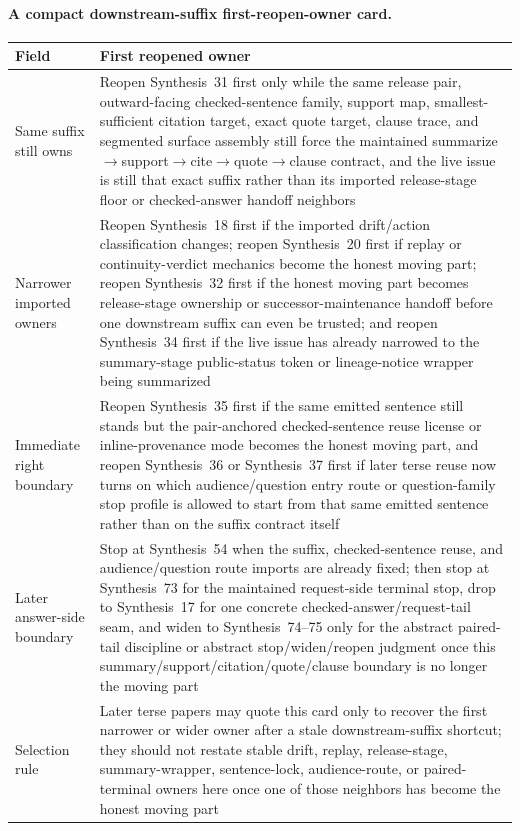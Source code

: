 \documentclass[11pt]{article}
\begin{document}
\paragraph{A compact downstream-suffix first-reopen-owner card.}
\begin{table}[t]
\centering
\small
\begin{tabularx}{\linewidth}{@{}lX@{}}
\toprule
Field & First reopened owner \\
\midrule
Same suffix still owns & Reopen Synthesis~31 first only while the same release pair, outward-facing checked-sentence family, support map, smallest-sufficient citation target, exact quote target, clause trace, and segmented surface assembly still force the maintained summarize$\to$support$\to$cite$\to$quote$\to$clause contract, and the live issue is still that exact suffix rather than its imported release-stage floor or checked-answer handoff neighbors \\
Narrower imported owners & Reopen Synthesis~18 first if the imported drift/action classification changes; reopen Synthesis~20 first if replay or continuity-verdict mechanics become the honest moving part; reopen Synthesis~32 first if the honest moving part becomes release-stage ownership or successor-maintenance handoff before one downstream suffix can even be trusted; and reopen Synthesis~34 first if the live issue has already narrowed to the summary-stage public-status token or lineage-notice wrapper being summarized \\
Immediate right boundary & Reopen Synthesis~35 first if the same emitted sentence still stands but the pair-anchored checked-sentence reuse license or inline-provenance mode becomes the honest moving part, and reopen Synthesis~36 or Synthesis~37 first if later terse reuse now turns on which audience/question entry route or question-family stop profile is allowed to start from that same emitted sentence rather than on the suffix contract itself \\
Later answer-side boundary & Stop at Synthesis~54 when the suffix, checked-sentence reuse, and audience/question route imports are already fixed; then stop at Synthesis~73 for the maintained request-side terminal stop, drop to Synthesis~17 for one concrete checked-answer/request-tail seam, and widen to Synthesis~74--75 only for the abstract paired-tail discipline or abstract stop/widen/reopen judgment once this summary/support/citation/quote/clause boundary is no longer the moving part \\
Selection rule & Later terse papers may quote this card only to recover the first narrower or wider owner after a stale downstream-suffix shortcut; they should not restate stable drift, replay, release-stage, summary-wrapper, sentence-lock, audience-route, or paired-terminal owners here once one of those neighbors has become the honest moving part \\

\end{tabularx}
\end{table}
\end{document}
